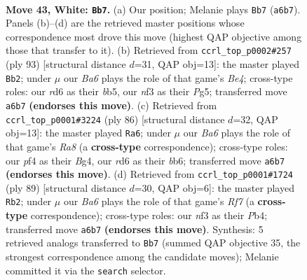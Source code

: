 \documentclass[11pt]{article}
\begin{document}
\clearpage

\begin{figure}[p]\centering
\begin{subfigure}{0.46\textwidth}\centering
\resizebox{\linewidth}{!}{%
\newchessgame
\chessboard[
  setfen={8/6k1/BN1r4/4p1p1/5p2/5n2/8/5K2 w - - 2 43},
  showmover=false,
  pgfstyle=straightmove, color=movearrow, markmove={a6-b7}
]}
\caption{}
\end{subfigure}\hfill
\begin{subfigure}{0.46\textwidth}\centering
\resizebox{\linewidth}{!}{%
\newchessgame
\chessboard[
  setfen={7k/8/8/1B2b1p1/pP6/P7/4PK2/8 b - - 0 47},
  showmover=false,
  pgfstyle=straightmove, color=movearrow, markmove={e5-b2}
]}
\caption{}
\end{subfigure}
\\[4pt]
\begin{subfigure}{0.46\textwidth}\centering
\resizebox{\linewidth}{!}{%
\newchessgame
\chessboard[
  setfen={R7/5pk1/1b1n4/4p1p1/6B1/4N3/8/1K6 w - - 5 44},
  showmover=false,
  pgfstyle=straightmove, color=movearrow, markmove={a8-a6}
]}
\caption{}
\end{subfigure}\hfill
\begin{subfigure}{0.46\textwidth}\centering
\resizebox{\linewidth}{!}{%
\newchessgame
\chessboard[
  setfen={8/8/R6n/4K2k/Pp2P3/1P6/5r2/8 b - - 2 45},
  showmover=false,
  pgfstyle=straightmove, color=movearrow, markmove={f2-b2}
]}
\caption{}
\end{subfigure}
\caption{\textbf{Move 43, White: \texttt{Bb7}.} (a) Our position; Melanie plays \texttt{Bb7} (\texttt{a6b7}). Panels (b)--(d) are the retrieved master positions whose correspondence most drove this move (highest QAP objective among those that transfer to it). (b) Retrieved from \texttt{ccrl\_top\_p0002\#257} (ply 93) [structural distance $d$=31, QAP obj=13]: the master played \texttt{Bb2}; under $\mu$ our \emph{Ba6} plays the role of that game's \emph{Be4}; cross-type roles: our \emph{r}d6 as their \emph{b}b5, our \emph{n}f3 as their \emph{P}g5; transferred move \texttt{a6b7} \textbf{(endorses this move)}. (c) Retrieved from \texttt{ccrl\_top\_p0001\#3224} (ply 86) [structural distance $d$=32, QAP obj=13]: the master played \texttt{Ra6}; under $\mu$ our \emph{Ba6} plays the role of that game's \emph{Ra8} (a \textbf{cross-type} correspondence); cross-type roles: our \emph{p}f4 as their \emph{B}g4, our \emph{r}d6 as their \emph{b}b6; transferred move \texttt{a6b7} \textbf{(endorses this move)}. (d) Retrieved from \texttt{ccrl\_top\_p0001\#1724} (ply 89) [structural distance $d$=30, QAP obj=6]: the master played \texttt{Rb2}; under $\mu$ our \emph{Ba6} plays the role of that game's \emph{Rf7} (a \textbf{cross-type} correspondence); cross-type roles: our \emph{n}f3 as their \emph{P}b4; transferred move \texttt{a6b7} \textbf{(endorses this move)}. Synthesis: 5 retrieved analogs transferred to \texttt{Bb7} (summed QAP objective 35, the strongest correspondence among the candidate moves); Melanie committed it via the \texttt{search} selector.}
\label{fig:thought-m84}
\end{figure}
\end{document}
